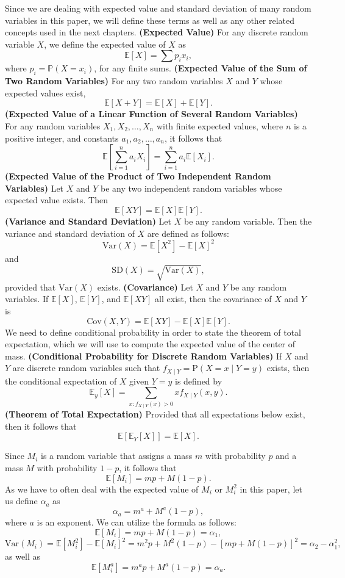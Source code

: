 \documentclass[11pt, twoside, reqno]{book}
\newcommand{\sd}{\text{SD}}
\newcommand{\Var}{\text{Var}}
\newcommand{\Cov}{\text{Cov}}
\newcommand{\E}{\mathbb{E}}
\begin{document}
\noindent Since we are dealing with expected value and standard deviation of many random variables in this paper, we will define these terms as well as any other related concepts used in the next chapters.
\textbf{(Expected Value)} For any discrete random variable $X$, we define the expected value of $X$ as
$$\E[X] = \sum p_{i}x_{i},$$
where $p_{i} = \mathbb{P}(X = x_{i})$, for any finite sums.
\edefn
\thm
\textbf{(Expected Value of the Sum of Two Random Variables)} For any two random variables $X$ and $Y$ whose expected values exist, 
$$\E[X+Y]=\E[X]+\E[Y].$$
\ethm
\coro
\textbf{(Expected Value of a Linear Function of Several Random Variables)} For any random variables $X_{1}, X_{2},\dots, X_{n}$ with finite expected values, where $n$ is a positive integer, and constants $a_{1}, a_{2}, \dots, a_{n}$, it follows that
$$\E \left[\sum_{i=1}^{n}a_{i}X_{i} \right] = \sum_{i=1}^{n} a_{i} \E[X_{i}].$$
\ecoro
{}
\textbf{(Expected Value of the Product of Two Independent Random Variables)} Let $X$ and $Y$ be any two independent random variables whose expected value exists. Then
$$\E[XY] = \E[X]\E[Y].$$
\edefn
{}
\textbf{(Variance and Standard Deviation)} Let $X$ be any random variable. Then the variance and standard deviation of $X$ are defined as follows:
$$\Var(X) = \E[X^{2}]-\E[X]^{2}$$
and
$$\sd(X)=\sqrt{\Var(X)},$$
provided that $\Var(X)$ exists.
\edefn
{}
\textbf{(Covariance)} Let $X$ and $Y$ be any random variables. If $\E[X]$, $\E[Y]$, and $\E[XY]$ all exist, then the covariance of $X$ and $Y$ is
$$\Cov(X,Y) = \E[XY] - \E[X]\E[Y].$$
\edefn
\noindent We need to define conditional probability in order to state the theorem of total expectation, which we will use to compute the expected value of the center of mass.
 \textbf{(Conditional Probability for Discrete Random Variables)}
If $X$ and $Y$ are discrete random variables such that $f_{X\mid Y} = \text{P}(X=x \mid Y=y)$ exists, then the conditional expectation of $X$ given $Y=y$ is defined by
$$\E_{y}[X]=\sum_{x:f_{X \mid Y}(x)>0} xf_{X\mid Y} (x,y).$$
\edefn
\thm \textbf{(Theorem of Total Expectation)} Provided that all expectations below exist, then it follows that
$$\E[\E_{Y}[X]] = \E[X].$$
\ethm

\noindent Since $M_{i}$ is a random variable that assigns a mass $m$ with probability $p$ and a mass $M$ with probability $1-p$, it follows that
$$\E[M_{i}] = mp + M(1-p).$$
As we have to often deal with the expected value of $M_{i}$ or $M_{i}^{2}$ in this paper, let us define $\alpha_{a}$ as 
$$\alpha_{a} = m^{a}+M^{a}(1-p),$$ where $a$ is an exponent. We can utilize the formula as follows:
$$\E[M_{i}] = mp+M(1-p) = \alpha_{1},$$
$$\Var(M_{i}) = \E [M_{i}^{2}]-\E[M_{i}]^{2} = m^{2}p+M^{2}(1-p) - [mp+M(1-p)]^{2}=\alpha_{2} - \alpha_{1}^{2},$$
as well as
$$\E[M_{i}^{a}] = m^{a}p+M^{a}(1-p) = \alpha_{a}.$$
\end{document}
